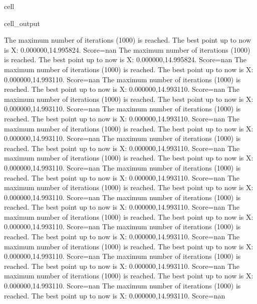 \documentclass[letterpaper,10pt,english]{jupyterBook}
\begin{document}
\begin{sphinxuseclass}{cell}
\begin{sphinxVerbatimOutput}
\begin{sphinxuseclass}{cell_output}
\begin{sphinxVerbatim}[commandchars=\\\{\}]
The maximum number of iterations (1000) is reached. The best point up to now is X: \PYGZob{}0.000000,14.995824\PYGZcb{}. Score=\PYGZhy{}nan
The maximum number of iterations (1000) is reached. The best point up to now is X: \PYGZob{}0.000000,14.995824\PYGZcb{}. Score=\PYGZhy{}nan
The maximum number of iterations (1000) is reached. The best point up to now is X: \PYGZob{}0.000000,14.993110\PYGZcb{}. Score=\PYGZhy{}nan
The maximum number of iterations (1000) is reached. The best point up to now is X: \PYGZob{}0.000000,14.993110\PYGZcb{}. Score=\PYGZhy{}nan
The maximum number of iterations (1000) is reached. The best point up to now is X: \PYGZob{}0.000000,14.993110\PYGZcb{}. Score=\PYGZhy{}nan
The maximum number of iterations (1000) is reached. The best point up to now is X: \PYGZob{}0.000000,14.993110\PYGZcb{}. Score=\PYGZhy{}nan
The maximum number of iterations (1000) is reached. The best point up to now is X: \PYGZob{}0.000000,14.993110\PYGZcb{}. Score=\PYGZhy{}nan
The maximum number of iterations (1000) is reached. The best point up to now is X: \PYGZob{}0.000000,14.993110\PYGZcb{}. Score=\PYGZhy{}nan
The maximum number of iterations (1000) is reached. The best point up to now is X: \PYGZob{}0.000000,14.993110\PYGZcb{}. Score=\PYGZhy{}nan
The maximum number of iterations (1000) is reached. The best point up to now is X: \PYGZob{}0.000000,14.993110\PYGZcb{}. Score=\PYGZhy{}nan
The maximum number of iterations (1000) is reached. The best point up to now is X: \PYGZob{}0.000000,14.993110\PYGZcb{}. Score=\PYGZhy{}nan
The maximum number of iterations (1000) is reached. The best point up to now is X: \PYGZob{}0.000000,14.993110\PYGZcb{}. Score=\PYGZhy{}nan
The maximum number of iterations (1000) is reached. The best point up to now is X: \PYGZob{}0.000000,14.993110\PYGZcb{}. Score=\PYGZhy{}nan
The maximum number of iterations (1000) is reached. The best point up to now is X: \PYGZob{}0.000000,14.993110\PYGZcb{}. Score=\PYGZhy{}nan
The maximum number of iterations (1000) is reached. The best point up to now is X: \PYGZob{}0.000000,14.993110\PYGZcb{}. Score=\PYGZhy{}nan
The maximum number of iterations (1000) is reached. The best point up to now is X: \PYGZob{}0.000000,14.993110\PYGZcb{}. Score=\PYGZhy{}nan
The maximum number of iterations (1000) is reached. The best point up to now is X: \PYGZob{}0.000000,14.993110\PYGZcb{}. Score=\PYGZhy{}nan
The maximum number of iterations (1000) is reached. The best point up to now is X: \PYGZob{}0.000000,14.993110\PYGZcb{}. Score=\PYGZhy{}nan

\end{sphinxVerbatim}
\end{sphinxuseclass}
\end{sphinxVerbatimOutput}
\end{sphinxuseclass}
\end{document}
